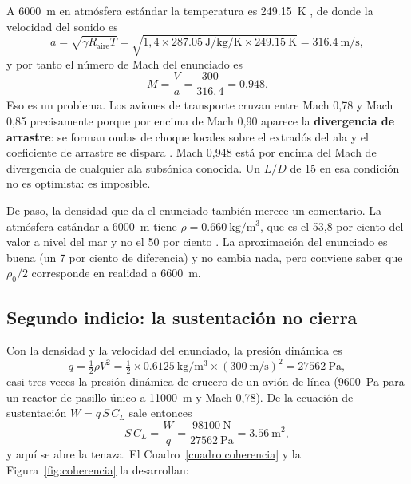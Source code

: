 \documentclass[11pt,letterpaper]{article}
\begin{document}
A \SI{6000}{\meter} en atmósfera estándar la temperatura es
\SI{249.15}{\kelvin} \parencite{iso2533}, de donde la velocidad del sonido es
\begin{equation}
a = \sqrt{\gamma R_{\text{aire}} T}
  = \sqrt{1{,}4 \times \SI{287.05}{\joule\per\kilogram\per\kelvin}
          \times \SI{249.15}{\kelvin}}
  = \SI{316.4}{\meter\per\second},
\end{equation}
y por tanto el número de Mach del enunciado es
\begin{equation}
M = \frac{V}{a} = \frac{300}{316{,}4} = \num{0.948}.
\end{equation}
Eso es un problema. Los aviones de transporte cruzan entre Mach 0,78 y Mach
0,85 precisamente porque por encima de Mach 0,90 aparece la
\textbf{divergencia de arrastre}: se forman ondas de choque locales sobre el
extradós del ala y el coeficiente de arrastre se dispara
\parencite{anderson1999}. Mach 0,948 está por encima del Mach de divergencia de
cualquier ala subsónica conocida. Un \(L/D\) de 15 en esa condición no es
optimista: es imposible.

De paso, la densidad que da el enunciado también merece un comentario. La
atmósfera estándar a \SI{6000}{\meter} tiene
\(\rho = \SI{0.660}{\kilogram\per\meter\cubed}\), que es el 53,8 por ciento del
valor a nivel del mar y no el 50 por ciento \parencite{iso2533}. La
aproximación del enunciado es buena (un 7 por ciento de diferencia) y no cambia
nada, pero conviene saber que \(\rho_0/2\) corresponde en realidad a
\SI{6600}{\meter}.

\subsection{Segundo indicio: la sustentación no cierra}

Con la densidad y la velocidad del enunciado, la presión dinámica es
\begin{equation}
q = \tfrac{1}{2}\rho V^{2}
  = \tfrac{1}{2}\times\SI{0.6125}{\kilogram\per\meter\cubed}
    \times(\SI{300}{\meter\per\second})^{2}
  = \SI{27562}{\pascal},
\end{equation}
casi tres veces la presión dinámica de crucero de un avión de línea
(\SI{9600}{\pascal} para un reactor de pasillo único a \SI{11000}{\meter} y
Mach 0,78). De la ecuación de sustentación \(W = q\,S\,C_L\) sale entonces
\begin{equation}
S\,C_L = \frac{W}{q} = \frac{\SI{98100}{\newton}}{\SI{27562}{\pascal}}
       = \SI{3.56}{\meter\squared},
\end{equation}
y aquí se abre la tenaza. El Cuadro~\ref{cuadro:coherencia} y la
Figura~\ref{fig:coherencia} la desarrollan:
\end{document}
